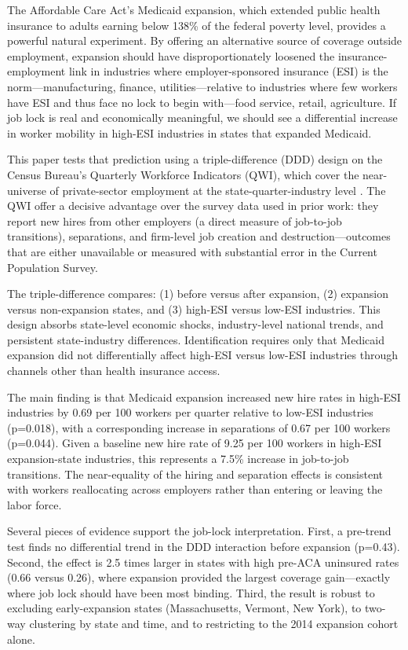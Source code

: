 \documentclass[12pt]{article}
\begin{document}
The Affordable Care Act's Medicaid expansion, which extended public health insurance to adults earning below 138\% of the federal poverty level, provides a powerful natural experiment. By offering an alternative source of coverage outside employment, expansion should have disproportionately loosened the insurance-employment link in industries where employer-sponsored insurance (ESI) is the norm---manufacturing, finance, utilities---relative to industries where few workers have ESI and thus face no lock to begin with---food service, retail, agriculture. If job lock is real and economically meaningful, we should see a differential increase in worker mobility in high-ESI industries in states that expanded Medicaid.

This paper tests that prediction using a triple-difference (DDD) design on the Census Bureau's Quarterly Workforce Indicators (QWI), which cover the near-universe of private-sector employment at the state-quarter-industry level \citep{abowd2009lehd}. The QWI offer a decisive advantage over the survey data used in prior work: they report new hires from other employers (a direct measure of job-to-job transitions), separations, and firm-level job creation and destruction---outcomes that are either unavailable or measured with substantial error in the Current Population Survey.

The triple-difference compares: (1) before versus after expansion, (2) expansion versus non-expansion states, and (3) high-ESI versus low-ESI industries. This design absorbs state-level economic shocks, industry-level national trends, and persistent state-industry differences. Identification requires only that Medicaid expansion did not differentially affect high-ESI versus low-ESI industries through channels other than health insurance access.

The main finding is that Medicaid expansion increased new hire rates in high-ESI industries by 0.69 per 100 workers per quarter relative to low-ESI industries (p=0.018), with a corresponding increase in separations of 0.67 per 100 workers (p=0.044). Given a baseline new hire rate of 9.25 per 100 workers in high-ESI expansion-state industries, this represents a 7.5\% increase in job-to-job transitions. The near-equality of the hiring and separation effects is consistent with workers reallocating across employers rather than entering or leaving the labor force.

Several pieces of evidence support the job-lock interpretation. First, a pre-trend test finds no differential trend in the DDD interaction before expansion (p=0.43). Second, the effect is 2.5 times larger in states with high pre-ACA uninsured rates (0.66 versus 0.26), where expansion provided the largest coverage gain---exactly where job lock should have been most binding. Third, the result is robust to excluding early-expansion states (Massachusetts, Vermont, New York), to two-way clustering by state and time, and to restricting to the 2014 expansion cohort alone.
\end{document}
